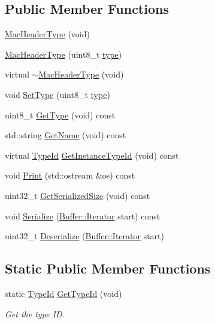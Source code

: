 \subsection*{Public Member Functions}
\begin{DoxyCompactItemize}
\item 
\hyperlink{classns3_1_1MacHeaderType_a43b01ea939687d81b558d2573aef2d33}{Mac\+Header\+Type} (void)
\item 
\hyperlink{classns3_1_1MacHeaderType_a347af69cdb74b19e840b82895da3c11b}{Mac\+Header\+Type} (uint8\+\_\+t \hyperlink{visualizer-ideas_8txt_add98db9e15e2a58cf2b57623e7aa893a}{type})
\item 
virtual \hyperlink{classns3_1_1MacHeaderType_a54ce9e046f2e01a4c157865cdd862013}{$\sim$\+Mac\+Header\+Type} (void)
\item 
void \hyperlink{classns3_1_1MacHeaderType_a1dc300c28da8f01cbf7fbd8ffa012d77}{Set\+Type} (uint8\+\_\+t \hyperlink{visualizer-ideas_8txt_add98db9e15e2a58cf2b57623e7aa893a}{type})
\item 
uint8\+\_\+t \hyperlink{classns3_1_1MacHeaderType_aa207fe18499a20663fdb536a46961137}{Get\+Type} (void) const 
\item 
std\+::string \hyperlink{classns3_1_1MacHeaderType_aae06dbce6c8b535f0c47f0a09a6f0cc3}{Get\+Name} (void) const 
\item 
virtual \hyperlink{classns3_1_1TypeId}{Type\+Id} \hyperlink{classns3_1_1MacHeaderType_a21a66c2ea0caa964253ddfcf7b07db01}{Get\+Instance\+Type\+Id} (void) const 
\item 
void \hyperlink{classns3_1_1MacHeaderType_aad107381e67376636f31ae6ccbd0c4ba}{Print} (std\+::ostream \&os) const 
\item 
uint32\+\_\+t \hyperlink{classns3_1_1MacHeaderType_a2aeee557a499ba3153a7b44e62726374}{Get\+Serialized\+Size} (void) const 
\item 
void \hyperlink{classns3_1_1MacHeaderType_abc1cdf3d8339e54c2a45f4e4ca295efd}{Serialize} (\hyperlink{classns3_1_1Buffer_1_1Iterator}{Buffer\+::\+Iterator} start) const 
\item 
uint32\+\_\+t \hyperlink{classns3_1_1MacHeaderType_a627719724e405469d757b7d6fbdda545}{Deserialize} (\hyperlink{classns3_1_1Buffer_1_1Iterator}{Buffer\+::\+Iterator} start)
\end{DoxyCompactItemize}
\subsection*{Static Public Member Functions}
\begin{DoxyCompactItemize}
\item 
static \hyperlink{classns3_1_1TypeId}{Type\+Id} \hyperlink{classns3_1_1MacHeaderType_af24cd6d5c824e0d1ade438bd63f2ec57}{Get\+Type\+Id} (void)
\begin{DoxyCompactList}\small\item\em Get the type ID. \end{DoxyCompactList}\end{DoxyCompactItemize}
